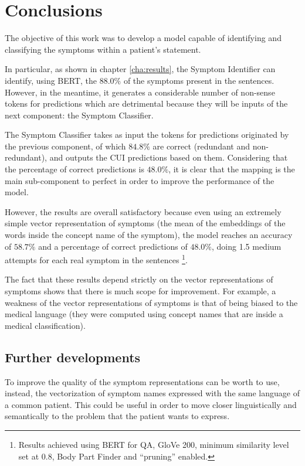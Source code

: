 \chapter{Conclusions}
\label{cha:conclusions}

The objective of this work was to develop a model capable of identifying and classifying the symptoms within a patient's statement.

In particular, as shown in chapter \ref{cha:results}, the Symptom Identifier can identify, using BERT, the $88.0 \%$ of the symptoms present in the sentences. However, in the meantime, it generates a considerable number of non-sense tokens for predictions which are detrimental because they will be inputs of the next component: the Symptom Classifier.

The Symptom Classifier takes as input the tokens for predictions originated by the previous component, of which $84.8 \%$ are correct (redundant and non-redundant), and outputs the CUI predictions based on them. Considering that the percentage of correct predictions is $48.0 \%$, it is clear that the mapping is the main sub-component to perfect in order to improve the performance of the model.

However, the results are overall satisfactory because even using an extremely simple vector representation of symptoms (the mean of the embeddings of the words inside the concept name of the symptom), the model reaches an accuracy of $58.7 \%$ and a percentage of correct predictions of $48.0 \%$, doing 1.5 medium attempts for each real symptom in the sentences \footnote{Results achieved using BERT for QA, GloVe 200, minimum similarity level set at 0.8, Body Part Finder and ``pruning'' enabled.}.

The fact that these results depend strictly on the vector representations of symptoms shows that there is much scope for improvement. For example, a weakness of the vector representations of symptoms is that of being biased to the medical language (they were computed using concept names that are inside a medical classification). 

\section{Further developments}
To improve the quality of the symptom representations can be worth to use, instead, the vectorization of symptom names expressed with the same language of a common patient. This could be useful in order to move closer linguistically and semantically to the problem that the patient wants to express.

